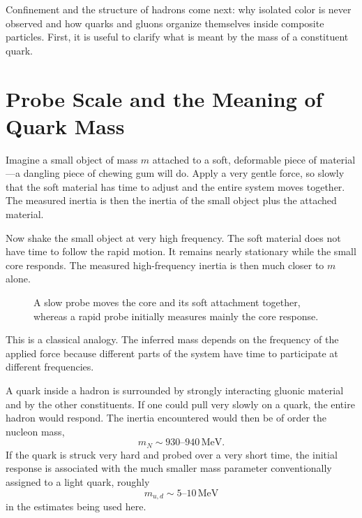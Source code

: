 Confinement and the structure of hadrons come next: why isolated color is never observed and how quarks and gluons organize themselves inside composite particles. First, it is useful to clarify what is meant by the mass of a constituent quark.

\section{Probe Scale and the Meaning of Quark Mass}

Imagine a small object of mass \(m\) attached to a soft, deformable piece of material---a dangling piece of chewing gum will do. Apply a very gentle force, so slowly that the soft material has time to adjust and the entire system moves together. The measured inertia is then the inertia of the small object plus the attached material.

Now shake the small object at very high frequency. The soft material does not have time to follow the rapid motion. It remains nearly stationary while the small core responds. The measured high-frequency inertia is then much closer to \(m\) alone.

\begin{figure}[h]
\centering
{}
\caption{A slow probe moves the core and its soft attachment together, whereas a rapid probe initially measures mainly the core response.}
\end{figure}

This is a classical analogy. The inferred mass depends on the frequency of the applied force because different parts of the system have time to participate at different frequencies.

A quark inside a hadron is surrounded by strongly interacting gluonic material and by the other constituents. If one could pull very slowly on a quark, the entire hadron would respond. The inertia encountered would then be of order the nucleon mass,
\begin{equation}
m_N\sim930\text{--}940\,\mathrm{MeV}.
\end{equation}
If the quark is struck very hard and probed over a very short time, the initial response is associated with the much smaller mass parameter conventionally assigned to a light quark, roughly
\begin{equation}
m_{u,d}\sim5\text{--}10\,\mathrm{MeV}
\end{equation}
in the estimates being used here.

